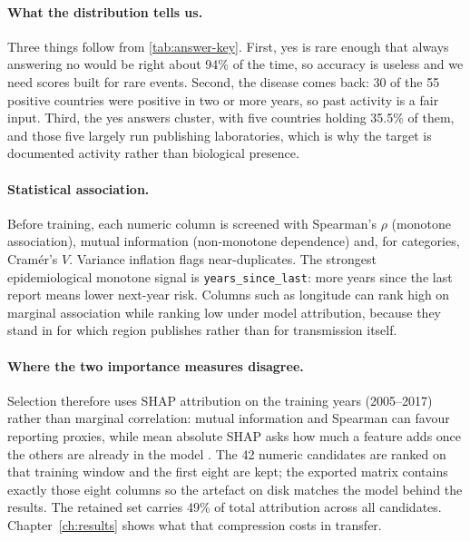 \documentclass[10pt,openany]{report}
\begin{document}
\paragraph{What the distribution tells us.}
Three things follow from \cref{tab:answer-key}. First, yes is rare enough that always answering no would be
right about 94\% of the time, so accuracy is useless and we need scores built for rare events.
Second, the disease comes back: 30 of the 55 positive countries were positive in two or more years,
so past activity is a fair input. Third, the yes answers cluster, with five countries holding 35.5\%
of them, and those five largely run publishing laboratories, which is why the target is documented
activity rather than biological presence.

\paragraph{Statistical association.}
Before training, each numeric column is screened with Spearman's $\rho$ (monotone association),
mutual information (non-monotone dependence) and, for categories, Cram\'er's $V$. Variance inflation
flags near-duplicates. The strongest epidemiological monotone signal is
\texttt{years\_since\_last}: more years since the last report means lower next-year risk. Columns
such as longitude can rank high on marginal association while ranking low under model attribution,
because they stand in for which region publishes rather than for transmission itself.

\paragraph{Where the two importance measures disagree.}
\label{sec:shapselect}
Selection therefore uses SHAP attribution on the training years (2005--2017) rather than marginal
correlation: mutual information and Spearman can favour reporting proxies, while mean absolute SHAP
asks how much a feature adds once the others are already in the model
\cite{lundberg2017}. The 42 numeric candidates are ranked on that training window and the first eight
are kept; the exported matrix contains exactly those eight columns so the artefact on disk matches
the model behind the results. The retained set carries 49\% of total attribution across all
candidates. Chapter~\ref{ch:results} shows what that compression costs in transfer.
\end{document}
